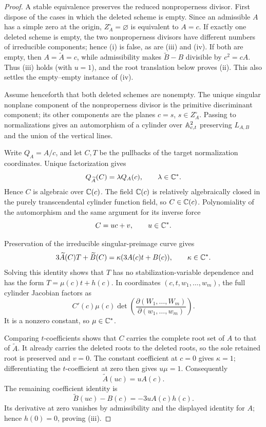 \begin{proof}
A stable equivalence preserves the reduced nonproperness divisor.  First
dispose of the cases in which the deleted scheme is empty.  Since an
admissible \(A\) has a simple zero at the origin, \(Z_A^\circ=\varnothing\)
is equivalent to \(A=c\).  If exactly one deleted scheme is empty, the two
nonproperness divisors have different numbers of irreducible components;
hence (i) is false, as are (iii) and (iv).  If both are empty, then
\(A=\widetilde A=c\), while admissibility makes
\(\widetilde B-B\) divisible by \(c^2=cA\).  Thus (iii) holds (with
\(u=1\)), and the root translation below proves (ii).  This also settles
the empty--empty instance of (iv).

Assume henceforth that both deleted schemes are nonempty.  The unique
singular nonplane component of the nonproperness divisor is the primitive
discriminant component; its other components are the planes \(c=s\),
\(s\in Z_A^\circ\).  Passing to normalizations gives an automorphism of a
cylinder over \(\mathbb A^2_{c,t}\) preserving \(L_{A,B}\) and the union of the
vertical lines.

Write \(Q_A=A/c\), and let \(C,T\) be the pullbacks of the target
normalization coordinates.  Unique factorization gives
\[
Q_{\widetilde A}(C)=\lambda Q_A(c),\qquad \lambda\in\mathbb C^*.
\]
Hence \(C\) is algebraic over \(\mathbb C(c)\).  The field \(\mathbb C(c)\) is relatively
algebraically closed in the purely transcendental cylinder function field,
so \(C\in\mathbb C(c)\).  Polynomiality of the automorphism and the same argument
for its inverse force
\[
C=uc+v,\qquad u\in\mathbb C^*.
\]

Preservation of the irreducible singular-preimage curve gives
\[
3\widetilde A(C)T+\widetilde B(C)
=\kappa(3A(c)t+B(c)),\qquad \kappa\in\mathbb C^*.
\]
Solving this identity shows that \(T\) has no stabilization-variable
dependence and has the form \(T=\mu(c)t+h(c)\).  In coordinates
\((c,t,w_1,\ldots,w_m)\), the full cylinder Jacobian factors as
\[
C'(c)\mu(c)
\det\!\left(\frac{\partial(W_1,\ldots,W_m)}
{\partial(w_1,\ldots,w_m)}\right).
\]
It is a nonzero constant, so \(\mu\in\mathbb C^*\).

Comparing \(t\)-coefficients shows that \(C\) carries the complete root set
of \(A\) to that of \(\widetilde A\).  It already carries the deleted roots
to the deleted roots, so the sole retained root is preserved and \(v=0\).
The constant coefficient at \(c=0\) gives \(\kappa=1\); differentiating the
\(t\)-coefficient at zero then gives \(u\mu=1\).  Consequently
\[
\widetilde A(uc)=uA(c).
\]
The remaining coefficient identity is
\[
\widetilde B(uc)-B(c)=-3uA(c)h(c).
\]
Its derivative at zero vanishes by admissibility and the displayed identity
for \(A\); hence \(h(0)=0\), proving (iii).


\end{proof}
